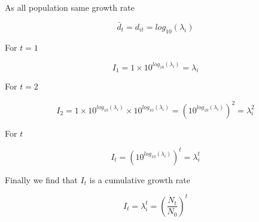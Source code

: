 \documentclass[A4,7pt]{article}
\begin{document}
As all population same growth rate

\begin{equation}
  \label{eq:d_bar2}
    \bar{d}_t = d_{it} = log_{10}\left(\lambda_i\right)
\end{equation}

For $t=1$

\begin{equation}
  \label{eq:I1}
  I_1 = 1 \times 10^{log_{10}\left(\lambda_i\right)} = \lambda_i
\end{equation}

For $t=2$

\begin{equation}
  \label{eq:I2}
  I_2 = 1 \times 10^{log_{10}\left(\lambda_i\right)} \times
    10^{log_{10}\left(\lambda_i\right)} =
    \left(10^{log_{10}\left(\lambda_i\right)}\right)^2 = \lambda_i^2
\end{equation}

For $t$


\begin{equation}
  \label{eq:It}
  I_t = \left(10^{log_{10}\left(\lambda_i\right)}\right)^t = \lambda_i^t
    \end{equation}

Finally we find that $I_t$ is a cumulative growth rate 

\begin{equation}
  \label{eq:It}
  I_t  = \lambda_i^t = \left( \frac{N_t}{N_0} \right)^t
    \end{equation}


  
    
    
\end{document}
